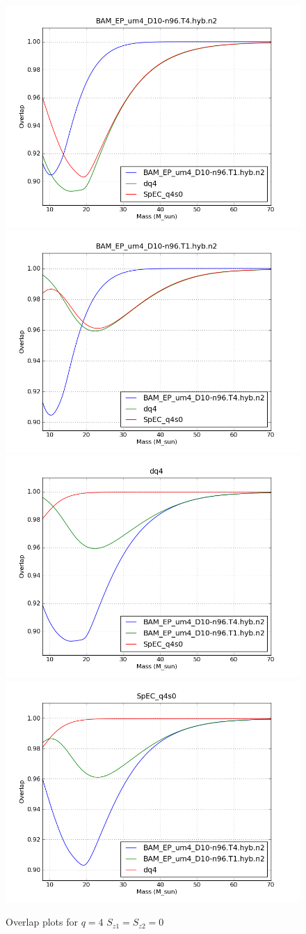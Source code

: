 \begin{figure}
  \includegraphics[width=0.5\linewidth]{figures/ninja2/figure_4_0_03.png} 
  \includegraphics[width=0.5\linewidth]{figures/ninja2/figure_4_0_06.png} \\
  \includegraphics[width=0.5\linewidth]{figures/ninja2/figure_4_0_09.png} 
  \includegraphics[width=0.5\linewidth]{figures/ninja2/figure_4_0_12.png} \\
  \caption[Overlap plots for $q=4$ $S_{z1} = S_{z2} = 0$]{
  \label{f:figure_4_0}
Overlap plots for $q=4$ $S_{z1} = S_{z2} = 0$}
\end{figure}%


